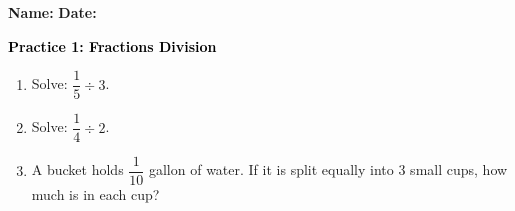 \documentclass[12pt, letterpaper, fleqn]{article}
\begin{document}
\textbf{Name:} \underline{\hspace{5cm}}
\hfill
\textbf{Date:} \underline{\hspace{3cm}}\\

\begin{tcolorbox}[colback=customteal!20]
    \large\textcolor{black}{\textbf{Practice 1: Fractions Division}}
\end{tcolorbox}
\begin{enumerate}[itemsep=3.5cm, leftmargin=0.6cm]
\item Solve: $\dfrac{1}{5} \div 3$.
\vspace{3.5cm}
\item Solve: $\dfrac{1}{4} \div 2$.
\vspace{3.5cm}
\item A bucket holds $\dfrac{1}{10}$ gallon of water. If it is split equally into 3 small cups, how much is in each cup?
\end{enumerate}
\end{document}
